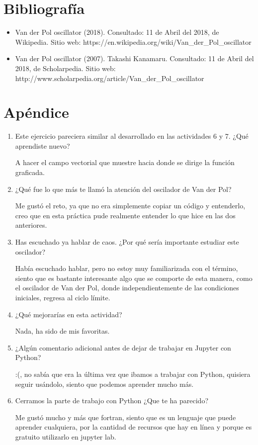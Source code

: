 \documentclass[12pt]{article}
\begin{document}
\section{Bibliografía}

\begin{itemize}
\item Van der Pol oscillator (2018). Consultado: 11 de Abril del 2018, de Wikipedia. Sitio web: https://en.wikipedia.org/wiki/Van\_der\_Pol\_oscillator
\item Van der Pol oscillator (2007). Takashi Kanamaru. Consultado: 11 de Abril del 2018, de Scholarpedia. Sitio web:  http://www.scholarpedia.org/article/Van\_der\_Pol\_oscillator
\end{itemize}

\section{Apéndice}

\begin{enumerate}
\item Este ejercicio pareciera similar al desarrollado en las actividades 6 y 7. ¿Qué aprendiste nuevo?

A hacer el campo vectorial que muestre hacia donde se dirige la función graficada. 

\item ¿Qué fue lo que más te llamó la atención del oscilador de Van der Pol?

Me gustó el reto, ya que no era simplemente copiar un código y entenderlo, creo que en esta práctica pude realmente entender lo que hice en las dos anteriores.

\item Has escuchado ya hablar de caos. ¿Por qué sería importante estudiar este oscilador?

Había escuchado hablar, pero no estoy muy familiarizada con el término, siento que es bastante interesante algo que se comporte de esta manera, como el oscilador de Van der Pol, donde independientemente de las condiciones iniciales, regresa al ciclo límite.

\item ¿Qué mejorarías en esta actividad?

Nada, ha sido de mis favoritas.

\item ¿Algún comentario adicional antes de dejar de trabajar en Jupyter con Python?

:(, no sabía que era la última vez que ibamos a trabajar con Python, quisiera seguir usándolo, siento que podemos aprender mucho más.

\item Cerramos la parte de trabajo con Python ¿Que te ha parecido?

Me gustó mucho y más que fortran, siento que es un lenguaje que puede aprender cualquiera, por la cantidad de recursos que hay en línea y porque es gratuito utilizarlo en jupyter lab.

\end{enumerate}
\end{document}
